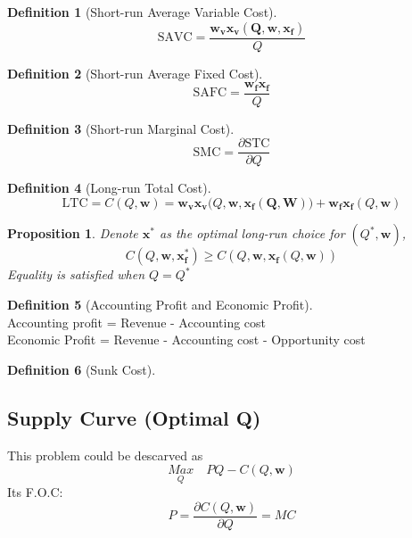 \documentclass{article}
\theoremstyle{plain}
\newtheorem{prop}[thm]{Proposition}
\theoremstyle{definition}
\newtheorem{defn}{Definition}[section]
\theoremstyle{remark}
\begin{document}
\begin{defn}[Short-run Average Variable Cost]
\begin{equation}
	\text{SAVC} = \frac{\bm{w_v}\bm{x_v(Q,\bm{w},\bm{x_f})}}{Q}
\end{equation}
\end{defn}


\begin{defn}[Short-run Average Fixed Cost]
\begin{equation}
	\text{SAFC} = \frac{\bm{w_f}\bm{x_f}}{Q}
\end{equation}
\end{defn}

\begin{defn}[Short-run Marginal Cost]
\begin{equation}
	\text{SMC} = \frac{\partial \text{STC}}{\partial Q}
\end{equation}
\end{defn}

\begin{defn}[Long-run Total Cost]
\begin{equation}
	\text{LTC} = C(Q,\bm{w}) = \bm{w_v}\bm{x_v}(Q,\bm{w},\bm{x_f(Q,\bm{W}))} + \bm{w_f}\bm{x_f}(Q,\bm{w})
\end{equation}
\end{defn}

\begin{prop}
Denote $\bm{x^{*}}$ as the optimal long-run choice for $(Q^{*},\bm{w})$, 
\begin{equation}
	C(Q,\bm{w},\bm{x^{*}_f}) \geq C(Q,\bm{w},\bm{x_f}(Q,\bm{w}))
\end{equation}
Equality is satisfied when $Q = Q^{*}$
\end{prop}

\begin{defn}[Accounting Profit and Economic Profit]\quad\\
Accounting profit = Revenue - Accounting cost\\
Economic Profit = Revenue - Accounting cost - Opportunity cost
\end{defn}

\begin{defn}[Sunk Cost]
\end{defn}

\subsection{Supply Curve (Optimal Q)}
This problem could be descarved as
\begin{equation}
	\underset{Q}{Max} \quad PQ - C(Q,\bm{w})
\end{equation}
Its F.O.C:
\begin{equation}
	P = \frac{\partial C(Q,\bm{w})}{\partial Q} = MC
\end{equation}
\end{document}
